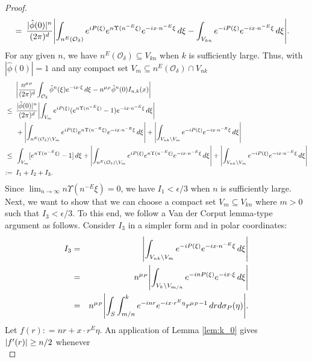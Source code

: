 \documentclass[11pt]{article}
\newcommand{\f}[2]{\frac{#1}{#2}}
\begin{document}
\begin{proof}
\begin{align*}
    =\,\,\, &{\f{|\hat{\phi}(0)|^n}{(2\pi)^d}}  \abs{ \int_{n^{E}(\mathcal{O}_\delta)} e^{iP(\xi)} e^{n\Upsilon(n^{-E}\xi)} e^{-i x\cdot n^{-E} \xi} \,d\xi -   \int_{V_{kn}}e^{-iP(\xi)}e^{-ix\cdot n^{-E} \xi}\,d\xi }.
\end{align*}
For any given $n$, we have $n^{E}(\mathcal{O}_\delta) \subseteq V_{kn}$ when $k$ is sufficiently large. Thus, with $|\hat{\phi}(0)| = 1$ and any compact set $V_m \subseteq n^E(\mathcal{O}_\delta) \cap V_{nk}$
\begin{align*}
    &\abs {\frac{n^{\mu_P}}{(2\pi)^d}\int_{\mathcal{O}_\delta} \hat{\phi}^n(\xi) e^{-i x\cdot \xi} \,d\xi - n^{\mu_P}  \hat{\phi}^n(0) I_{n,k}(x) } \\
    \leq\,\,\, 
    & \f{|\hat{\phi}(0)|^n}{(2\pi)^d}
    \abs{ \int_{V_m} e^{iP(\xi)} ( e^{n\Upsilon(n^{-E}\xi)} - 1) 
    e^{-i x\cdot n^{-E}\xi } \,d\xi} \\
    & + \abs{\int_{n^E(\mathcal{O}_\delta) \setminus V_m} 
    e^{iP(\xi)} e^{n\Upsilon(n^{-E}\xi)} e^{-i x\cdot n^{-E} \xi}\,d\xi } 
    + \abs{\int_{V_{nk} \setminus V_m} e^{-iP(\xi)}   e^{-ix\cdot n^{-E} \xi} \,d\xi } \\
    \leq\,\,\, & 
    \int_{V_m}  [e^{n\Upsilon(n^{-E}\xi)} - 1] \,d\xi 
    + \abs{\int_{n^E(\mathcal{O}_\delta) \setminus V_m} e^{iP(\xi)} e^{n\Upsilon(n^{-E}\xi)} e^{-i x\cdot n^{-E} \xi}\,d\xi } 
    + \abs{\int_{V_{nk} \setminus V_m} e^{-iP(\xi)}   e^{-ix\cdot n^{-E} \xi} \,d\xi   } \\
    := \,\,\,& I_1 + I_2 + I_3.
\end{align*}
Since $\lim_{n \to \infty} n\Upsilon(n^{-E}\xi)= 0 $, we have $I_1 < \epsilon/3$ when $n$ is sufficiently large. Next, we want to show that we can choose a compact set $V_m \subseteq V_{kn}$ where $m > 0$ such that $I_3 < \epsilon/3$. To this end, we follow a Van der Corput lemma-type argument as follows. Consider $I_3$ in a simpler form and in polar coordinates:
\begin{eqnarray*}
    I_3 
    &=& \abs{\int_{V_{nk} \setminus V_m} e^{-iP(\xi)}   e^{-ix\cdot n^{-E} \xi} \,d\xi   }   \\
    &=& n^{\mu_P}\abs{\int_{V_k \setminus V_{m/n}} e^{-i n P(\xi)} e^{-i x\cdot \xi}\,d\xi} \\
    &=& n^{\mu_P} \abs{\int_S \int_{m/n}^{k} e^{-inr}e^{-i x\cdot  r^E \eta}r^{\mu_P - 1}\,drd\sigma_P(\eta)}.
\end{eqnarray*}
Let $f(r): =  nr + x\cdot r^E\eta$. An application of Lemma \ref{lem:k_0} gives $\abs{f'(r)} \geq n/2$ whenever
\begin{equation*}

\end{equation*}
\end{proof}
\end{document}
